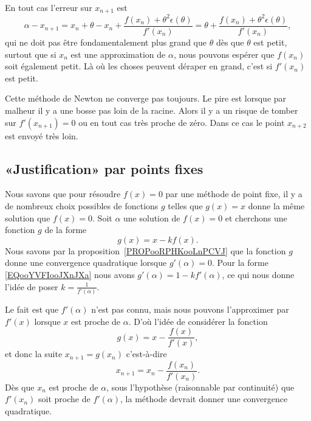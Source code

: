 En tout cas l'erreur sur \( x_{n+1}\) est
\begin{equation}
	\alpha-x_{n+1}=x_n+\theta-x_n+\frac{ f(x_n)+\theta^2\epsilon(\theta) }{ f'(x_n) }=\theta+\frac{ f(x_n)+\theta^2\epsilon(\theta) }{ f'(x_n) },
\end{equation}
qui ne doit pas être fondamentalement plus grand que \( \theta\) dès que \( \theta\) est petit, surtout que si \( x_n\) est une approximation de \( \alpha\), nous pouvons espérer que \( f(x_n)\) soit également petit. Là où les choses peuvent déraper en grand, c'est si \( f'(x_n)\) est petit.

Cette méthode de Newton ne converge pas toujours. Le pire est lorsque par malheur il y a une bosse pas loin de la racine. Alors il y a un risque de tomber sur \( f'(x_{n+1})=0\) ou en tout cas très proche de zéro. Dans ce cas le point \( x_{n+2}\) est envoyé très loin.

\subsection{«Justification» par points fixes}
\label{SUBSECooIBLNooTujslO}

Nous savons que pour résoudre \( f(x)=0\) par une méthode de point fixe, il y a de nombreux choix possibles de fonctions \( g\) telles que \( g(x)=x\) donne la même solution que \( f(x)=0\). Soit \( \alpha\) une solution de \( f(x)=0\) et cherchons une fonction \( g\) de la forme
\begin{equation}        \label{EQooYVFIooJXnJXa}
	g(x)=x-kf(x).
\end{equation}
Nous savons par la proposition~\ref{PROPooRPHKooLnPCVJ} que la fonction \( g\) donne une convergence quadratique lorsque \( g'(\alpha)=0\). Pour la forme \eqref{EQooYVFIooJXnJXa} nous avons \( g'(\alpha)=1-kf'(\alpha)\), ce qui nous donne l'idée de poser \( k=\frac{1}{ f'(\alpha) }\).

Le fait est que \( f'(\alpha)\) n'est pas connu, mais nous pouvons l'approximer par \( f'(x)\) lorsque \( x\) est proche de \( \alpha\). D'où l'idée de considérer la fonction
\begin{equation}
	g(x)=x-\frac{ f(x) }{ f'(x) },
\end{equation}
et donc la suite \( x_{n+1}=g(x_n)\) c'est-à-dire
\begin{equation}
	x_{n+1}=x_n-\frac{ f(x_n) }{ f'(x_n) }.
\end{equation}
Dès que \( x_n\) est proche de \( \alpha\), sous l'hypothèse (raisonnable par continuité) que \( f'(x_n)\) soit proche de \( f'(\alpha)\), la méthode devrait donner une convergence quadratique.


